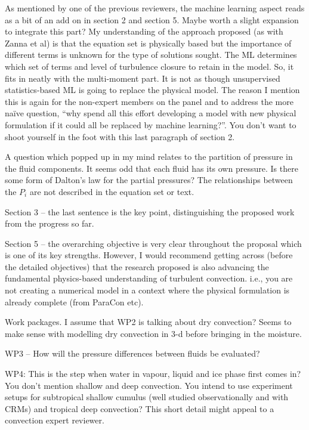 \documentclass[11pt,a4paper]{article}
\begin{document}
{{\color{blue}
As mentioned by one of the previous reviewers, the machine learning aspect reads as a bit of an add on in section 2 and section 5. Maybe worth a slight expansion to integrate this part? My understanding of the approach proposed (as with Zanna et al) is that the equation set is physically based but the importance of different terms is unknown for the type of solutions sought. The ML determines which set of terms and level of turbulence closure to retain in the model. So, it fits in neatly with the multi-moment part. It is not as though unsupervised statistics-based ML is going to replace the physical model. The reason I mention this is again for the non-expert members on the panel and to address the more naïve question, “why spend all this effort developing a model with new physical formulation if it could all be replaced by machine learning?”. You don’t want to shoot yourself in the foot with this last paragraph of section 2. }

{\color{blue}
A question which popped up in my mind relates to the partition of pressure in the fluid components. It seems odd that each fluid has its own pressure. Is there some form of Dalton’s law for the partial pressures? The relationships between the $P_i$ are not described in the equation set or text. }

{\color{blue}
Section 3 – the last sentence is the key point, distinguishing the proposed work from the progress so far. }

{\color{blue}
Section 5 – the overarching objective is very clear throughout the proposal which is one of its key strengths. However, I would recommend getting across (before the detailed objectives) that the research proposed is also advancing the fundamental physics-based understanding of turbulent convection. i.e., you are not creating a numerical model in a context where the physical formulation is already complete (from ParaCon etc). }

{\color{blue}
Work packages. I assume that WP2 is talking about dry convection? Seems to make sense with modelling dry convection in 3-d before bringing in the moisture. }

{\color{blue}
WP3 – How will the pressure differences between fluids be evaluated? }

WP4: This is the step when water in vapour, liquid and ice phase first comes in? You don’t mention shallow and deep convection. You intend to use experiment setups for subtropical shallow cumulus (well studied observationally and with CRMs) and tropical deep convection? This short detail might appeal to a convection expert reviewer. 

}
\end{document}
